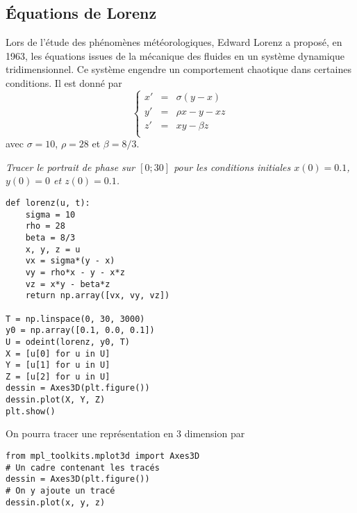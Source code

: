 \subsection{Équations de Lorenz}
\begin{minipage}{0.50\linewidth}
Lors de l'étude des phénomènes météorologiques, Edward Lorenz a proposé, en 1963, les équations issues de la mécanique des fluides en un système dynamique tridimensionnel. Ce système engendre un comportement chaotique dans certaines conditions. Il est donné par
\[\left\{\begin{matrix}
x'&=&\sigma(y-x)\\ 
y' &=& \rho x - y - xz\\
z'&=& xy - \beta z\\
\end{matrix}\right.\]
avec $\sigma = 10$, $\rho = 28$ et $\beta = 8/3$.
\begin{Exercise}\it
Tracer le portrait de phase sur $[0;30]$ pour les conditions initiales $x(0) =0.1$, $y(0) =0$ et $z(0) =0.1$.
\end{Exercise}
\begin{Answer}
\begin{lstlisting}
def lorenz(u, t):
    sigma = 10
    rho = 28
    beta = 8/3
    x, y, z = u
    vx = sigma*(y - x)
    vy = rho*x - y - x*z
    vz = x*y - beta*z
    return np.array([vx, vy, vz])

T = np.linspace(0, 30, 3000)
y0 = np.array([0.1, 0.0, 0.1])
U = odeint(lorenz, y0, T)
X = [u[0] for u in U]
Y = [u[1] for u in U]
Z = [u[2] for u in U]
dessin = Axes3D(plt.figure()) 
dessin.plot(X, Y, Z) 
plt.show()
\end{lstlisting}
\newpage
\end{Answer}
On pourra tracer une représentation en 3 dimension par
\begin{lstlisting}
from mpl_toolkits.mplot3d import Axes3D
# Un cadre contenant les tracés
dessin = Axes3D(plt.figure()) 
# On y ajoute un tracé
dessin.plot(x, y, z) 
\end{lstlisting}
\end{minipage}
